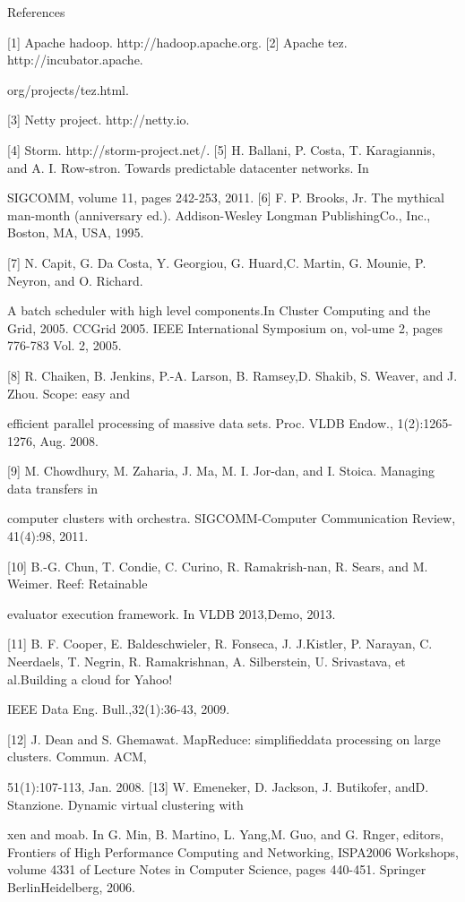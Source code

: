 References

[1] Apache hadoop. http://hadoop.apache.org.
[2] Apache tez. http://incubator.apache.

org/projects/tez.html.

[3] Netty project. http://netty.io.

[4] Storm. http://storm-project.net/.
[5] H. Ballani, P. Costa, T. Karagiannis, and A. I. Row-stron. Towards predictable datacenter networks. In

SIGCOMM, volume 11, pages 242-253, 2011.
[6] F. P. Brooks, Jr. The mythical man-month (anniversary ed.). Addison-Wesley Longman PublishingCo., Inc., Boston, MA, USA, 1995.

[7] N. Capit, G. Da Costa, Y. Georgiou, G. Huard,C. Martin, G. Mounie, P. Neyron, and O. Richard.

A batch scheduler with high level components.In Cluster Computing and the Grid, 2005. CCGrid 2005. IEEE International Symposium on, vol-ume 2, pages 776-783 Vol. 2, 2005.

[8] R. Chaiken, B. Jenkins, P.-A. Larson, B. Ramsey,D. Shakib, S. Weaver, and J. Zhou. Scope: easy and

efficient parallel processing of massive data sets.
Proc. VLDB Endow., 1(2):1265-1276, Aug. 2008.

[9] M. Chowdhury, M. Zaharia, J. Ma, M. I. Jor-dan, and I. Stoica. Managing data transfers in

computer clusters with orchestra. SIGCOMM-Computer Communication Review, 41(4):98, 2011.

[10] B.-G. Chun, T. Condie, C. Curino, R. Ramakrish-nan, R. Sears, and M. Weimer. Reef: Retainable

evaluator execution framework. In VLDB 2013,Demo, 2013.

[11] B. F. Cooper, E. Baldeschwieler, R. Fonseca, J. J.Kistler, P. Narayan, C. Neerdaels, T. Negrin, R. Ramakrishnan, A. Silberstein, U. Srivastava, et al.Building a cloud for Yahoo!

IEEE Data Eng. Bull.,32(1):36-43, 2009.

[12] J. Dean and S. Ghemawat. MapReduce: simplifieddata processing on large clusters. Commun. ACM,

51(1):107-113, Jan. 2008.
[13] W. Emeneker, D. Jackson, J. Butikofer, andD. Stanzione. Dynamic virtual clustering with

xen and moab. In G. Min, B. Martino, L. Yang,M. Guo, and G. Rnger, editors, Frontiers of High
Performance Computing and Networking, ISPA2006 Workshops, volume 4331 of Lecture Notes in
Computer Science, pages 440-451. Springer BerlinHeidelberg, 2006.

